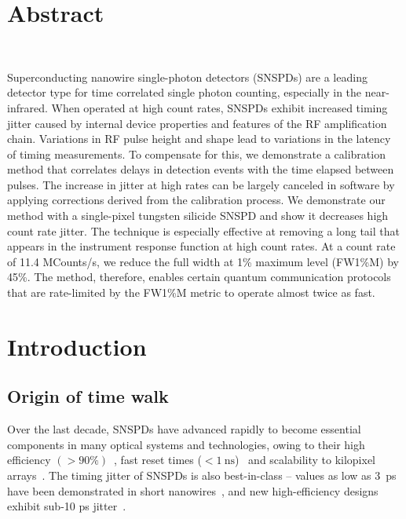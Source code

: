 \documentclass[11pt]{caltech_thesis} %
\begin{document}
\hypertarget{abstract-1}{%
\section{Abstract}\label{abstract-1}}

~~~~~

Superconducting nanowire single-photon detectors (SNSPDs) are a leading detector type for time correlated single photon counting, especially in the near-infrared. When operated at high count rates, SNSPDs exhibit increased timing jitter caused by internal device properties and features of the RF amplification chain. Variations in RF pulse height and shape lead to variations in the latency of timing measurements. To compensate for this, we demonstrate a calibration method that correlates delays in detection events with the time elapsed between pulses. The increase in jitter at high rates can be largely canceled in software by applying corrections derived from the calibration process. We demonstrate our method with a single-pixel tungsten silicide SNSPD and show it decreases high count rate jitter. The technique is especially effective at removing a long tail that appears in the instrument response function at high count rates. At a count rate of 11.4 MCounts/s, we reduce the full width at 1\% maximum level (FW1\%M) by 45\%. The method, therefore, enables certain quantum communication protocols that are rate-limited by the FW1\%M metric to operate almost twice as fast.

\hypertarget{introduction-1}{%
\section{Introduction}\label{introduction-1}}

\hypertarget{origin-of-time-walk}{%
\subsection{Origin of time walk}\label{origin-of-time-walk}}

Over the last decade, SNSPDs have advanced rapidly to become essential components in many optical systems and technologies, owing to their high efficiency $(>90\%)$~\autocite{99.5_Chang_2021,reddy2020superconducting}, fast reset times ($< 1~\mathrm{ns}$)~\autocite{Vetter2016Cavity} and scalability to kilopixel arrays~\autocite{Wollman2019}. The timing jitter of SNSPDs is also best-in-class -- values as low as 3~ps have been demonstrated in short nanowires~\autocite{Korzh2020}, and new high-efficiency designs exhibit sub-10 ps jitter~\autocite{EsmaeilZadeh2020,Colangelo2021}.
\end{document}
